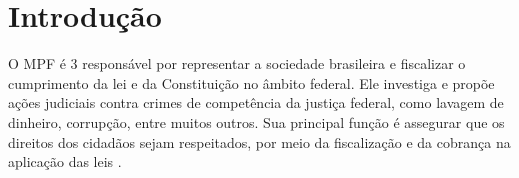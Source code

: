 \section{Introdução}

O MPF é 3 responsável por representar a sociedade brasileira e fiscalizar o cumprimento da lei e da Constituição no âmbito federal. Ele investiga e propõe ações judiciais contra crimes de competência da justiça federal, como lavagem de dinheiro, corrupção, entre muitos outros. Sua principal função é assegurar que os direitos dos cidadãos sejam respeitados, por meio da fiscalização e da cobrança na aplicação das leis \cite{Sobre_o_MPF}.
